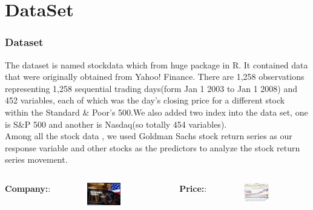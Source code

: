 \documentclass[xcolor={x11names,svgnames,dvipsnames}]{beamer}
\begin{document}
\section{DataSet}
\begin{frame}
\frametitle{Dataset}
The dataset is named stockdata which from huge package in R. It contained data that were
originally obtained from Yahoo! Finance. There are 1,258
observations representing 1,258 sequential trading days(form Jan 1 2003 to Jan 1 2008) and 452
variables, each of which was the day's closing price for a different
stock within the Standard \& Poor's 500.We also added two index into the data set, one is S\&P 500 and another is Nasdaq(so totally 454 variables).\\
Among all the stock data , we used Goldman Sachs stock return
series as our response variable and other stocks as the predictors to analyze the stock return series movement.
\begin{columns}
\column{2.3in}
\textbf{Company:}:
 \begin{figure}
     \includegraphics[width=0.6\textwidth, height=0.25\textheight]{gschart.jpg}
\end{figure}

\column{2.3in}

\textbf{Price:}:
\begin{figure}
     \includegraphics[width=0.6\textwidth, height=0.3\textheight]{gs_plot.jpg}
\end{figure}

\end{columns}
\end{frame}
\end{document}
